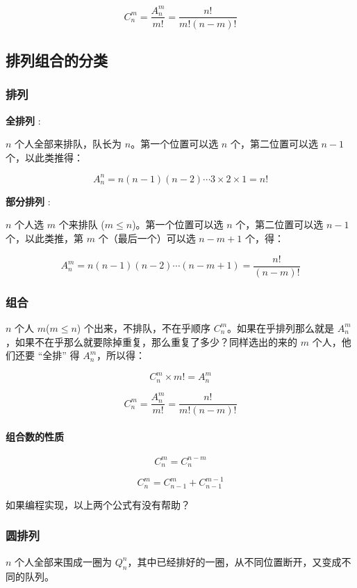 $$
C_n^m = \frac{A_n^m}{m!} = \frac{n!}{m!(n - m)!}
$$

\subsection{排列组合的分类}

\subsubsection{排列}

\textbf{ 全排列 }:  

$n$ 个人全部来排队，队长为 $n$。第一个位置可以选 $n$ 个，第二位置可以选 $n-1$ 个，以此类推得：

$$
A_n^n = n(n-1)(n-2) \cdots 3 × 2 × 1 = n!
$$

\textbf{ 部分排列 }:  

$n$ 个人选 $m$ 个来排队 ($m \le n$)。第一个位置可以选 $n$ 个，第二位置可以选 $n-1$ 个，以此类推，第 $m$ 个（最后一个）可以选 $n-m+1$ 个，得：

$$
A_n^m = n(n-1)(n-2) \cdots (n-m+1) = \frac{n!}{(n - m)!}
$$

\subsubsection{组合}

$n$ 个人 $m$($m \le n$) 个出来，不排队，不在乎顺序 $C_n^m$。如果在乎排列那么就是 $A_n^m$，如果不在乎那么就要除掉重复，那么重复了多少？同样选出的来的 $m$ 个人，他们还要 “全排” 得 $A_n^m$，所以得：

$$
C_n^m \times m! = A_n^m
$$

$$
C_n^m = \frac{A_n^m}{m!} = \frac{n!}{m!(n-m)!}
$$

\paragraph{组合数的性质}

$$
C_n^m = C_{n}^{n-m}
$$

$$
C_n^m = C_{n-1}^{m} + C_{n-1}^{m-1}
$$

如果编程实现，以上两个公式有没有帮助？

\subsubsection{圆排列}

$n$ 个人全部来围成一圈为 $Q_n^n$，其中已经排好的一圈，从不同位置断开，又变成不同的队列。  

